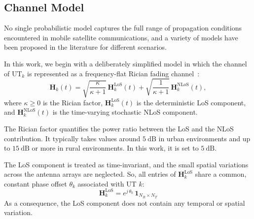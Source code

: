 \subsection{Channel Model}

No single probabilistic model captures the full range of propagation conditions encountered in mobile satellite communications, and a variety of models have been proposed in the literature for different scenarios.

In this work, we begin with a deliberately simplified model in which the channel of \ac{UT}$_k$ is represented as a frequency-flat Rician fading channel~\cite{4_mimo_over_satellite_review, 7_coherence_time_non_terrestrial}:
\begin{equation}
\label{eq:rician_channel_model}
    \mathbf{H}_k(t) = \sqrt{\frac{\kappa}{\kappa+1}} \, \mathbf{H}_k^{\mathrm{LoS}}(t) + \sqrt{\frac{1}{\kappa+1}} \, \mathbf{H}_k^{\mathrm{NLoS}}(t),
\end{equation}
where $\kappa \geq 0$ is the Rician factor, $\mathbf{H}_k^{\mathrm{LoS}}(t)$ is the deterministic \acf{LoS} component, and $\mathbf{H}_k^{\mathrm{NLoS}}(t)$ is the time-varying stochastic \acf{NLoS} component.

The Rician factor quantifies the power ratio between the \ac{LoS} and the \ac{NLoS} contribution.
It typically takes values around $5~\mathrm{dB}$ in urban environments and up to $15~\mathrm{dB}$ or more in rural environments.
In this work, it is set to $5~\mathrm{dB}$.

The \ac{LoS} component is treated as time-invariant, and the small spatial variations across the antenna arrays are neglected. 
So, all entries of $\mathbf{H}_k^{\mathrm{LoS}}$ share a common, constant phase offset $\theta_k$ associated with \ac{UT} $k$:
\begin{equation}
\label{eq:rician_channel_LoS}
    \mathbf{H}_k^{\mathrm{LoS}} = e^{j\,\theta_k} \, \mathbf{1}_{N_R \times N_T}
\end{equation}
As a consequence, the \ac{LoS} component does not contain any temporal or spatial variation.

